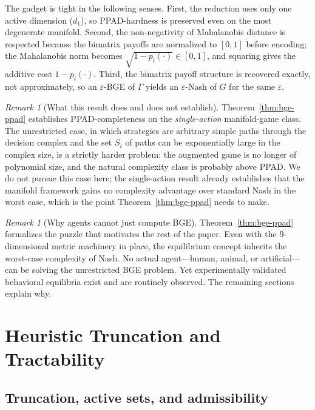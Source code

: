 \documentclass[11pt]{article}
\theoremstyle{definition}
\theoremstyle{remark}
\newtheorem{remark}[theorem]{Remark}
\begin{document}
The gadget is tight in the following senses. First, the reduction uses only one active dimension
($d_1$), so \textsc{PPAD}-hardness is preserved even on the most degenerate manifold. Second, the
non-negativity of Mahalanobis distance is respected because the bimatrix payoffs are normalized to
$[0,1]$ before encoding; the Mahalanobis norm becomes $\sqrt{1-p_i(\cdot)} \in [0,1]$, and squaring
gives the additive cost $1 - p_i(\cdot)$. Third, the bimatrix payoff structure is recovered exactly,
not approximately, so an $\varepsilon$-BGE of $\Gamma$ yields an $\varepsilon$-Nash of $G$ for the
same $\varepsilon$.

\begin{remark}[What this result does and does not establish]
\label{rem:scope-of-hardness}
Theorem~\ref{thm:bge-ppad} establishes \textsc{PPAD}-completeness on the \emph{single-action}
manifold-game class. The unrestricted case, in which strategies are arbitrary simple paths through
the decision complex and the set $S_i$ of paths can be exponentially large in the complex size, is a
strictly harder problem: the augmented game is no longer of polynomial size, and the natural
complexity class is probably above \textsc{PPAD}. We do not pursue this case here; the
single-action result already establishes that the manifold framework gains no complexity advantage
over standard Nash in the worst case, which is the point Theorem~\ref{thm:bge-ppad} needs to make.
\end{remark}

\begin{remark}[Why agents cannot just compute BGE]
Theorem~\ref{thm:bge-ppad} formalizes the puzzle that motivates the rest of the paper. Even with the
9-dimensional metric machinery in place, the equilibrium concept inherits the worst-case complexity
of Nash. No actual agent---human, animal, or artificial---can be solving the unrestricted BGE
problem. Yet experimentally validated behavioral equilibria exist and are routinely observed. The
remaining sections explain why.
\end{remark}


\section{Heuristic Truncation and Tractability}
\label{sec:truncation}

\subsection{Truncation, active sets, and admissibility}
\end{document}
